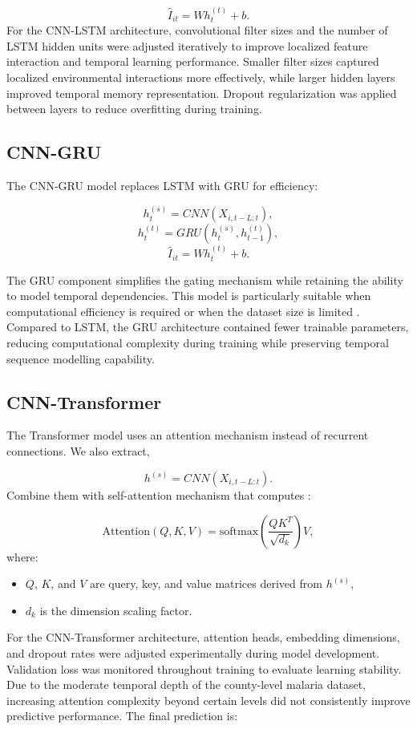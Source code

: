 	\[
	\hat{I}_{it} = W h^{(t)}_t + b.
	\]
For the CNN-LSTM architecture, convolutional filter sizes and the number of LSTM hidden units were adjusted iteratively to improve  localized feature interaction and temporal learning performance. Smaller filter sizes captured localized environmental interactions more effectively, while larger hidden layers improved temporal memory representation. Dropout regularization was applied between layers to reduce overfitting during training.
	
	\subsection{CNN-GRU}
	
	The CNN-GRU model replaces LSTM with GRU for efficiency:
	
	\[
	h^{(s)}_t = CNN(X_{i,t-L:t}),
	\]
	\[
	h^{(t)}_t = GRU(h^{(s)}_t, h^{(t)}_{t-1}),
	\]
	\[
	\hat{I}_{it} = W h^{(t)}_t + b.
	\]
	
	The GRU component simplifies the gating mechanism while retaining the ability to model temporal dependencies. This model is particularly suitable when computational efficiency is required or when the dataset size is limited \cite{Muriithi2024A}. Compared to LSTM, the GRU architecture contained fewer trainable parameters, reducing computational complexity during training while preserving temporal sequence modelling capability.
	
	\subsection{CNN-Transformer}
	
	The Transformer model uses an attention mechanism instead of recurrent connections. We also extract,
	
	\[
	h^{(s)} = CNN(X_{i,t-L:t}).
	\]
	Combine them with  self-attention mechanism that computes :
	
	\[
	\text{Attention}(Q,K,V) = \text{softmax} \left( \frac{QK^T}{\sqrt{d_k}} \right) V,
	\]
	where:
	\begin{itemize}
		\item $Q$, $K$, and $V$ are query, key, and value matrices derived from $h^{(s)}$,
		\item $d_k$ is the dimension scaling factor.
	\end{itemize}
   	For the CNN-Transformer architecture, attention heads, embedding dimensions, and dropout rates were adjusted experimentally during model development. Validation loss was monitored throughout training to evaluate learning stability. Due to the moderate temporal depth of the county-level malaria dataset, increasing attention complexity beyond certain levels did not consistently improve predictive performance\cite{Vaswani2017}.
	The final prediction is:
	
